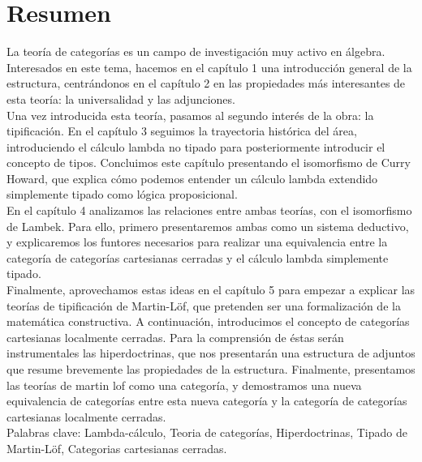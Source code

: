\newpage
{}
\section*{Resumen}
La teoría de categorías es un campo de investigación muy activo en álgebra. Interesados en este tema, hacemos en el capítulo 1 una introducción general de la estructura, centrándonos en el capítulo 2 en las propiedades más interesantes de esta teoría: la universalidad y las adjunciones. \\

Una vez introducida esta teoría, pasamos al segundo interés de la obra: la tipificación. En el capítulo 3 seguimos la trayectoria histórica del área, introduciendo el cálculo lambda no tipado para posteriormente introducir el concepto de tipos. Concluimos este capítulo presentando el isomorfismo de Curry Howard, que explica cómo podemos entender un cálculo lambda extendido simplemente tipado como lógica proposicional.\\

En el capítulo 4 analizamos las relaciones entre ambas teorías, con el isomorfismo de Lambek. Para ello, primero presentaremos ambas como un sistema deductivo, y explicaremos los funtores necesarios para realizar una equivalencia entre la categoría de categorías cartesianas cerradas y el cálculo lambda simplemente tipado.\\

 Finalmente, aprovechamos estas ideas en el capítulo 5 para empezar a explicar las teorías de tipificación de Martin-L\"of, que pretenden ser una formalización de la matemática constructiva. A continuación, introducimos el concepto de categorías cartesianas localmente cerradas. Para la comprensión de éstas serán instrumentales las hiperdoctrinas, que nos presentarán una estructura de adjuntos que resume brevemente las propiedades de la estructura. Finalmente, presentamos las teorías de martin lof como una categoría, y demostramos una nueva equivalencia de categorías entre esta nueva categoría y la categoría de categorías cartesianas localmente cerradas. \\

{Palabras clave: Lambda-cálculo, Teoria de categor\'ias, Hiperdoctrinas, Tipado de Martin-L\"of, Categorias cartesianas cerradas.} 




